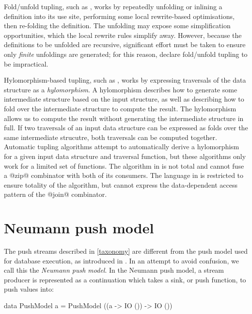 Fold/unfold tupling, such as \citet{chiba2010program}, works by repeatedly unfolding or inlining a definition into its use site, performing some local rewrite-based optimisations, then re-folding the definition.
The unfolding may expose some simplification opportunities, which the local rewrite rules simplify away.
However, because the definitions to be unfolded are recursive, significant effort must be taken to ensure only \emph{finite} unfoldings are generated; for this reason, \citet{hu1997tupling} declare fold/unfold tupling to be impractical.

Hylomorphism-based tupling, such as \citet{hu1996cheap}, works by expressing traversals of the data structure as a \emph{hylomorphism}.
A hylomorphism describes how to generate some intermediate structure based on the input structure, as well as describing how to fold over the intermediate structure to compute the result.
The hylomorphism allows us to compute the result without generating the intermediate structure in full.
If two traversals of an input data structure can be expressed as folds over the same intermediate strucutre, both traversals can be computed together.
Automatic tupling algorithms attempt to automatically derive a hylomorphism for a given input data structure and traversal function, but these algorithms only work for a limited set of functions.
The algorithm in \citet{launchbury1995warm} is not total and cannot fuse a @zip@ combinator with both of its consumers.
The language in \citet{hu1996deriving} is restricted to ensure totality of the algorithm, but cannot express the data-dependent access pattern of the @join@ combinator.


\section{Neumann push model}
\label{related/push-model}

The push streams described in \cref{taxonomy} are different from the push model used for database execution, as introduced in \citet{neumann2011efficiently}.
In an attempt to avoid confusion, we call this the \emph{Neumann push model}.
In the Neumann push model, a stream producer is represented as a continuation which takes a sink, or push function, to push values into:

\begin{haskell}
data PushModel a = PushModel ((a -> IO ()) -> IO ())
\end{haskell}

